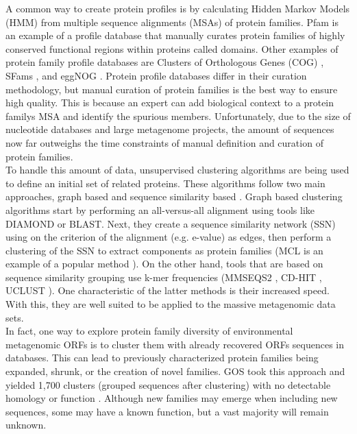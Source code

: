 A common way to create protein profiles is by calculating Hidden Markov Models (HMM) from multiple sequence alignments (MSAs) of protein families. Pfam \citep{Finn_2015} is an example of a profile database that manually curates protein families of highly conserved functional regions within proteins called domains. Other examples of protein family profile databases are Clusters of Orthologous Genes (COG) \citep{Tatusov_2000}, SFams \citep{Sharpton_2012}, and eggNOG \citep{Huerta_Cepas_2015}. Protein profile databases differ in their curation methodology, but manual curation of protein families is the best way to ensure high quality. This is because an expert can add biological context to a protein family\textquotesingle s MSA and identify the spurious members. Unfortunately, due to the size of nucleotide databases and large metagenome projects, the amount of sequences now far outweighs the time constraints of manual definition and curation of protein families.\\

To handle this amount of data, unsupervised clustering algorithms are being used to define an initial set of related proteins. These algorithms follow two main approaches, graph based and sequence similarity based \citep{Pavlopoulos_2017}. Graph based clustering algorithms start by performing an all-versus-all alignment using tools like DIAMOND or BLAST. Next, they create a sequence similarity network (SSN) using on the criterion of the alignment (e.g. e-value) as edges, then perform a clustering of the SSN to extract components as protein families (MCL is an example of a popular method \citep{Enright_2002}). On the other hand, tools that are based on sequence similarity grouping use k-mer frequencies (MMSEQS2 \citep{Steinegger_2017}, CD-HIT \citep{Li_2006}, UCLUST \citep{Edgar_2010}). One characteristic of the latter methods is their increased speed. With this, they are well suited to be applied to the massive metagenomic data sets.\\

In fact, one way to explore protein family diversity of environmental metagenomic ORFs is to cluster them with already recovered ORFs sequences in databases. This can lead to previously characterized protein families being expanded, shrunk, or the creation of novel families. GOS took this approach and yielded 1,700 clusters (grouped sequences after clustering) with no detectable homology or function \citep{Yooseph_2007}. Although new families may emerge when including new sequences, some may have a known function, but a vast majority will remain unknown.\\

